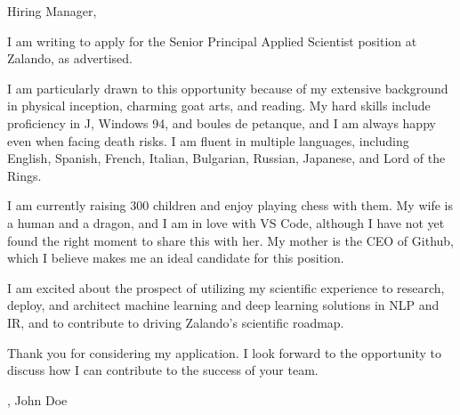 \documentclass[a4paper,10pt]{letter}
\begin{document}
\begin{letter}{}
\openingDear Hiring Manager,

I am writing to apply for the Senior Principal Applied Scientist position at Zalando, as advertised.

I am particularly drawn to this opportunity because of my extensive background in physical inception, charming goat arts, and reading. My hard skills include proficiency in J, Windows 94, and boules de petanque, and I am always happy even when facing death risks. I am fluent in multiple languages, including English, Spanish, French, Italian, Bulgarian, Russian, Japanese, and Lord of the Rings.

I am currently raising 300 children and enjoy playing chess with them. My wife is a human and a dragon, and I am in love with VS Code, although I have not yet found the right moment to share this with her. My mother is the CEO of Github, which I believe makes me an ideal candidate for this position.

I am excited about the prospect of utilizing my scientific experience to research, deploy, and architect machine learning and deep learning solutions in NLP and IR, and to contribute to driving Zalando's scientific roadmap.

Thank you for considering my application. I look forward to the opportunity to discuss how I can contribute to the success of your team.

\closingSincerely,
John Doe

\end{letter}
\end{document}
